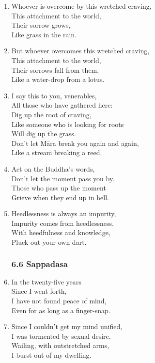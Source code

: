 \documentclass[10pt, openany]{book}
\begin{document}
\begin{enumerate}
\item Whoever is overcome by this wretched craving,\\
This attachment to the world,\\
Their sorrow grows,\\
Like grass in the rain.

\item But whoever overcomes this wretched craving,\\
This attachment to the world,\\
Their sorrows fall from them,\\
Like a water-drop from a lotus.

\item I say this to you, venerables,\\
All those who have gathered here:\\
Dig up the root of craving,\\
Like someone who is looking for roots \\
Will dig up the grass.\\
Don’t let Māra break you again and again,\\
Like a stream breaking a reed.

\item Act on the Buddha’s words,\\
Don’t let the moment pass you by.\\
Those who pass up the moment\\
Grieve when they end up in hell.

\item Heedlessness is always an impurity,\\
Impurity comes from heedlessness.\\
With heedfulness and knowledge,\\
Pluck out your own dart.

\subsubsection*{6.6 Sappadāsa}

\item In the twenty-five years\\
Since I went forth,\\
I have not found peace of mind,\\
Even for as long as a finger-snap.

\item Since I couldn’t get my mind unified,\\
I was tormented by sexual desire.\\
Wailing, with outstretched arms,\\
I burst out of my dwelling.


\end{enumerate}
\end{document}
